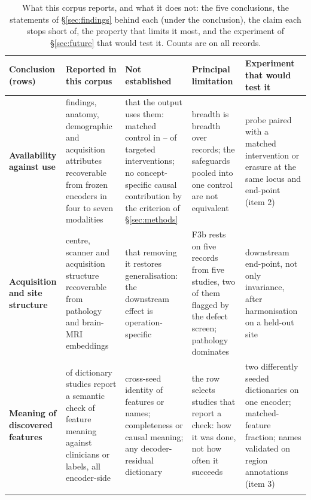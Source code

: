 \begin{table}[!tb]
\centering\footnotesize\setlength\tabcolsep{3pt}\renewcommand{\arraystretch}{1.08}
\caption{What this corpus reports, and what it does not: the five conclusions, the statements of
\S\ref{sec:findings} behind each (under the conclusion), the claim each stops short of, the property that limits it most, and the
experiment of \S\ref{sec:future} that would test it. Counts are on all records.}
\label{tab:synthesis}
\begin{tabular}{@{}L{2.45cm}L{3.3cm}L{3.2cm}L{3.2cm}L{3.2cm}@{}}
\toprule
Conclusion (rows) & Reported in this corpus & Not established & Principal limitation & Experiment that would test it \\
\midrule
\textbf{Availability against use}  & findings, anatomy, demographic and acquisition attributes recoverable from frozen encoders in four to seven modalities & that the output uses them: matched control in \Vspca{}--\Vspc{} of \Vspcn{} targeted interventions; no concept-specific causal contribution by the criterion of \S\ref{sec:methods} & breadth is breadth over records; the safeguards pooled into one control are not equivalent & probe paired with a matched intervention or erasure at the same locus and end-point (item 2) \\
\addlinespace[2pt]
\textbf{Acquisition and site structure}  & centre, scanner and acquisition structure recoverable from pathology and brain-MRI embeddings & that removing it restores generalisation: the downstream effect is operation-specific & F3b rests on five records from five studies, two of them flagged by the defect screen; pathology dominates & downstream end-point, not only invariance, after harmonisation on a held-out site \\
\addlinespace[2pt]
\textbf{Meaning of discovered features}  & \Nsaeval{} of \Nsae{} dictionary studies report a semantic check of feature meaning against clinicians or labels, all encoder-side & cross-seed identity of features or names; completeness or causal meaning; any decoder-residual dictionary & the row selects studies that report a check: how it was done, not how often it succeeds & two differently seeded dictionaries on one encoder; matched-feature fraction; names validated on region annotations (item 3) \\
\addlinespace[2pt]

\end{tabular}
\end{table}
